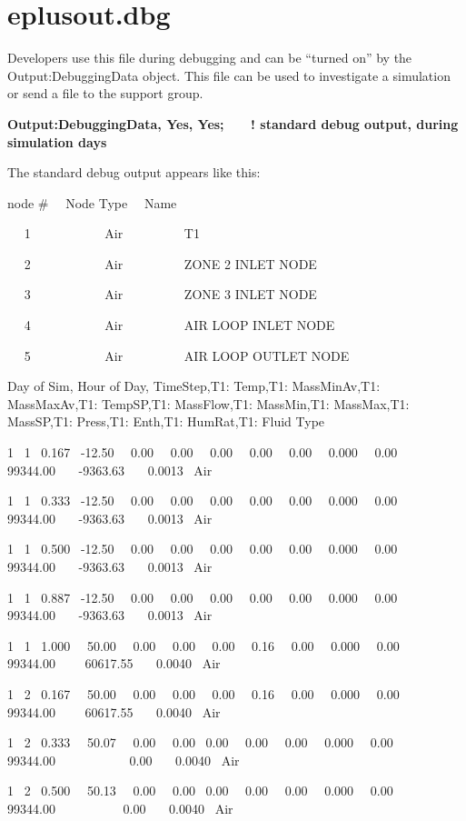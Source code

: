 \section{eplusout.dbg}\label{eplusout.dbg}

Developers use this file during debugging and can be ``turned on'' by the Output:DebuggingData object. This file can be used to investigate a simulation or send a file to the support group.

\textbf{Output:DebuggingData, Yes, Yes;~~~ ! standard debug output, during simulation days}

The standard debug output appears like this:

node \#~~ Node Type~~ Name

 ~~ 1~~~~~~~~~~~ Air~~~~~~~~~ T1

 ~~ 2~~~~~~~~~~~ Air~~~~~~~~~ ZONE 2 INLET NODE

 ~~ 3~~~~~~~~~~~ Air~~~~~~~~~ ZONE 3 INLET NODE

 ~~ 4~~~~~~~~~~~ Air~~~~~~~~~ AIR LOOP INLET NODE

 ~~ 5~~~~~~~~~~~ Air~~~~~~~~~ AIR LOOP OUTLET NODE

Day of Sim, Hour of Day, TimeStep,T1: Temp,T1: MassMinAv,T1: MassMaxAv,T1: TempSP,T1: MassFlow,T1: MassMin,T1: MassMax,T1: MassSP,T1: Press,T1: Enth,T1: HumRat,T1: Fluid Type

1~ 1~ 0.167~ -12.50~~ 0.00~~ 0.00~~ 0.00~~ 0.00~~ 0.00~~ 0.000~~ 0.00~~ 99344.00~~~ -9363.63~~~ 0.0013~ Air

1~ 1~ 0.333~ -12.50~~ 0.00~~ 0.00~~ 0.00~~ 0.00~~ 0.00~~ 0.000~~ 0.00~~ 99344.00~~~ -9363.63~~~ 0.0013~ Air

1~ 1~ 0.500~ -12.50~~ 0.00~~ 0.00~~ 0.00~~ 0.00~~ 0.00~~ 0.000~~ 0.00~~ 99344.00~~~ -9363.63~~~ 0.0013~ Air

1~ 1~ 0.887~ -12.50~~ 0.00~~ 0.00~~ 0.00~~ 0.00~~ 0.00~~ 0.000~~ 0.00~~ 99344.00~~~ -9363.63~~~ 0.0013~ Air

1~ 1~ 1.000~~ 50.00~~ 0.00~~ 0.00~~ 0.00~~ 0.16~~ 0.00~~ 0.000~~ 0.00~~ 99344.00~~~~ 60617.55~~~ 0.0040~ Air

1~ 2~ 0.167~~ 50.00~~ 0.00~~ 0.00~~ 0.00~~ 0.16~~ 0.00~~ 0.000~~ 0.00~~ 99344.00~~~~ 60617.55~~~ 0.0040~ Air

1~ 2~ 0.333~~ 50.07~~ 0.00~~ 0.00~ 0.00~~ 0.00~~ 0.00~~ 0.000~~ 0.00~~ 99344.00~~~~~~~~~~~ 0.00~~~ 0.0040~ Air

1~ 2~ 0.500~~ 50.13~~ 0.00~~ 0.00~ 0.00~~ 0.00~~ 0.00~~ 0.000~~ 0.00~~ 99344.00~~~~~~~~~~ 0.00~~~ 0.0040~ Air
